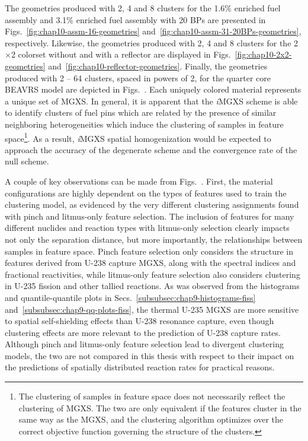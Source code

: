 
The geometries produced with 2, 4 and 8 clusters for the 1.6\% enriched fuel assembly and 3.1\% enriched fuel assembly with 20 \acp{BP} are presented in Figs.~\ref{fig:chap10-assm-16-geometries} and~\ref{fig:chap10-assm-31-20BPs-geometries}, respectively. Likewise, the geometries produced with 2, 4 and 8 clusters for the 2$\times$2 colorset without and with a reflector are displayed in Figs.~\ref{fig:chap10-2x2-geometries} and~\ref{fig:chap10-reflector-geometries}. Finally, the geometries produced with 2 -- 64 clusters, spaced in powers of 2, for the quarter core \ac{BEAVRS} model are depicted in Figs.~. Each uniquely colored material represents a unique set of MGXS. In general, it is apparent that the \textit{i}\ac{MGXS} scheme is able to identify clusters of fuel pins which are related by the presence of similar neighboring heterogeneities which induce the clustering of samples in feature space\footnote{The clustering of samples in feature space does not necessarily reflect the clustering of \ac{MGXS}. The two are only equivalent if the features cluster in the same way as the \ac{MGXS}, and the clustering algorithm optimizes over the correct objective function governing the structure of the clusters.}. As a result, \textit{i}\ac{MGXS} spatial homogenization would be expected to approach the accuracy of the degenerate scheme and the convergence rate of the null scheme. 

A couple of key observations can be made from Figs.~. First, the material configurations are highly dependent on the types of features used to train the clustering model, as evidenced by the very different clustering assignments found with pinch and litmus-only feature selection. The inclusion of features for many different nuclides and reaction types with litmus-only selection clearly impacts not only the separation distance, but more importantly, the relationships between samples in feature space. Pinch feature selection only considers the structure in features derived from U-238 capture \ac{MGXS}, along with the spectral indices and fractional reactivities, while litmus-only feature selection also considers clustering in U-235 fission and other tallied reactions. As was observed from the histograms and quantile-quantile plots in Secs.~\ref{subsubsec:chap9-histograms-fiss} and~\ref{subsubsec:chap9-qq-plots-fiss}, the thermal U-235 \ac{MGXS} are more sensitive to spatial self-shielding effects than U-238 resonance capture, even though clustering effects are more relevant to the prediction of U-238 capture rates. Although pinch and litmus-only feature selection lead to divergent clustering models, the two are not compared in this thesis with respect to their impact on the predictions of spatially distributed reaction rates for practical reasons. 

